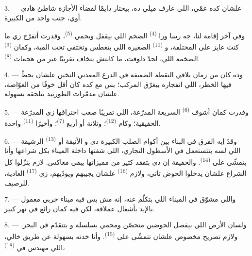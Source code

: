 3. --- علشان كده عمّي، اللي عارف ميلي ده، بيختار دايمًا لقضاء الأجازة شاطئ هادي
أوي، جنب واحد من  الكبيرة.

وفي آخر إقامة لنا،  جه رسا ورا 
\textsuperscript{(4)} الضخم اللي بيقفل ويحمي 
\textsuperscript{(5)}، وقدرت أتفرّج زي ما كنت عايز على 
المختلفة، و \textsuperscript{(10)} الصغيرة اللي بتغطس وتختفي تحت
المية، وكمان  \textsuperscript{(9)} الضخمة اللي، لحدّ دلوقت، ما
كانتش بتخاف تقريبًا غير من هجمات  \textsuperscript{(8)}.

\VUsaut{3.0mm}
\VUsaut{3.0mm}

4. --- وده كان  من زمان يلاقي النقطة الضعيفة في الدرع المعدني
التخين علشان يحطّ فيها  الخطر، اللي انفجاره بيغرّق المركب؛ بس
مع كده كان أقل خوفًا من الغوّاصة، علشان مدمّرات الطوربيد بتلحقه بسهولة.

5. --- وقدرت كمان أشوف  \textsuperscript{(6)} السريعة المدرّعة،
اللي تقريبًا صعب اختراقها زي المدرّعة الحقيقية؛ وكام 
\textsuperscript{(12)}؛ وتلاتة أو أربع  \textsuperscript{(7)}؛
وأخيرًا  \textsuperscript{(11)} واحدة.

6. --- وقدّ إيه الفرق في البناء بين أكوام الصلب الكبيرة دي و الأنيقة أو  \textsuperscript{(13)} الرشيقة اللي
لسه بتتستعمل في الأسطول التجاري، اللي شفتها داخلة الميناء بكل شراعها وأنا
بتمشّى على  \textsuperscript{(14)}. والحقيقة إن دي بتفقد كتير من
مميزاتها   يبقى معاكس. لازم ينزّلوا كل الشراع علشان
يدخلوا الحوض تاني، ولازم  \textsuperscript{(16)} علشان يجيبهم
ويودّيهم، زي  \textsuperscript{(17)} العادية، للرصيف.

\VUsaut{3.0mm}
\VUsaut{3.0mm}

7. --- واللي مشوّق في الميناء اللي بتكلّم عنه، إنه مش بس فيه ميناء حربي معمول
بالإيد بأشغال عملاقة، لكن فيه كمان  رائع في 
نهر كبير.

8. --- ولسان الأرض اللي بيفصل الحوضين متحصّن ومحمي بسلسلة 
و بتتقدّم في البحر. ولازم تصريح مخصوص علشان تتمشّى على
 \textsuperscript{(15)}. وأنا خدته بسهولة عن طريق خالي، اللي مهندس في
 \textsuperscript{(18)}،


